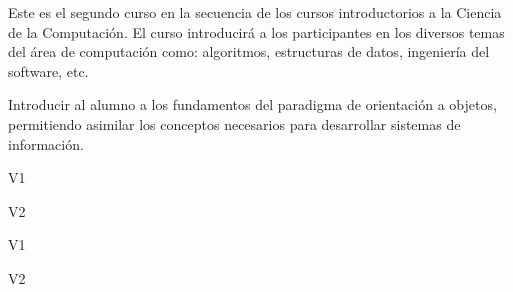\begin{syllabus}


\begin{justification}
Este es el segundo curso en la secuencia de los cursos introductorios a la Ciencia de la Computación.
El curso introducirá a los participantes en los diversos temas del área de computación como: algoritmos, estructuras de datos, ingeniería del software, etc.
\end{justification}

\begin{goals}
\item Introducir al alumno a los fundamentos del paradigma de orientación a objetos, permitiendo asimilar los conceptos necesarios para desarrollar sistemas de información.
\end{goals}

\begin{outcomes}{V1}
    \item {}
    \item {}
    \item {}
\end{outcomes}

\begin{outcomes}{V2}
    \item {}
    \item {}
    \item {}
\end{outcomes}

\begin{competences}{V1}
    \item {} 
    \item {} 
    \item {}
    \item {}
\end{competences}

\begin{competences}{V2}
    \item {} 
    \item {} 
    \item {}
    \item {}
\end{competences}


\end{syllabus}
